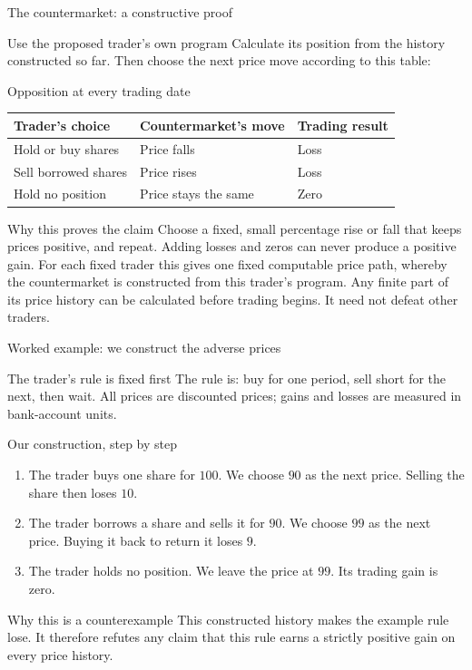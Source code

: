 \documentclass{beamer}
\begin{document}
\begin{frame}[shrink=5]{The countermarket: a constructive proof}
\small
\begin{block}{Use the proposed trader's own program}
Calculate its position from the history constructed so far. Then choose
the next price move according to this table:
\end{block}
\begin{exampleblock}{Opposition at every trading date}
\centering
\renewcommand{\arraystretch}{1.5}
\begin{tabular}{lll}
Trader's choice & Countermarket's move & Trading result\\\hline
\rowcolor{black!15}
Hold or buy shares & Price falls & Loss\\
Sell borrowed shares & Price rises & Loss\\
\rowcolor{black!15}
Hold no position & Price stays the same & Zero
\end{tabular}
\end{exampleblock}
\begin{alertblock}{Why this proves the claim}
Choose a fixed, small percentage rise or fall that keeps prices positive,
and repeat.
Adding losses and zeros can never produce a positive gain.
For each fixed trader this gives one fixed computable price path, whereby the countermarket is constructed from this trader's program.
Any finite part of its price history can be calculated before trading begins.
It need not defeat other traders.
\end{alertblock}
\end{frame}

\begin{frame}[shrink=5]{Worked example: we construct the adverse prices}
\small
\begin{block}{The trader's rule is fixed first}
The rule is: buy for one period, sell short for the next, then wait.
All prices are discounted prices; gains and losses are measured in
bank-account units.
\end{block}
\begin{exampleblock}{Our construction, step by step}
\begin{enumerate}
\setlength{\itemsep}{0.55em}
\item The trader buys one share for $100$.\newline
We choose $90$ as the next price. Selling the share then loses $10$.
\item The trader borrows a share and sells it for $90$.\newline
We choose $99$ as the next price. Buying it back to return it loses $9$.
\item The trader holds no position.\newline
We leave the price at $99$. Its trading gain is zero.
\end{enumerate}
\end{exampleblock}
\begin{alertblock}{Why this is a counterexample}
This constructed history makes the example rule lose.
It therefore refutes any claim that this rule earns a strictly positive
gain on every price history.
\end{alertblock}
\end{frame}
\end{document}

